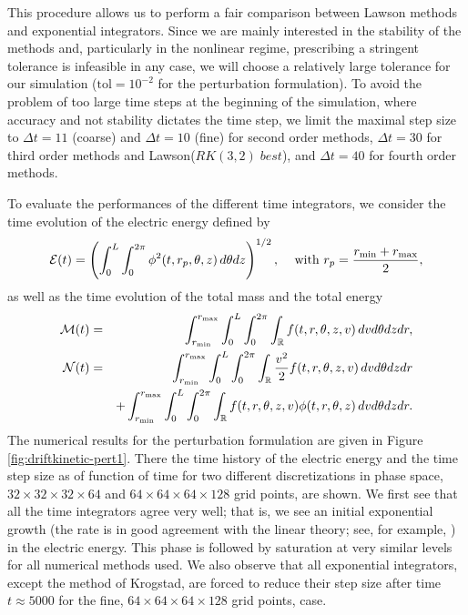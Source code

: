 This procedure allows us to perform a fair comparison between Lawson methods and exponential integrators. Since we are mainly interested in the stability of the methods and, particularly in the nonlinear regime, prescribing a stringent tolerance is infeasible in any case, we will choose a relatively large tolerance for our simulation ($\text{tol}=10^{-2}$ for the perturbation formulation). To avoid the problem of too large time steps at the beginning of the simulation, where accuracy and not stability dictates the time step, we limit the maximal step size to 
$\Delta t=11$ (coarse) and $\Delta t=10$ (fine) for second order methods, $\Delta t=30$ for third order methods and Lawson($RK(3, 2) \; best$), 
and $\Delta t=40$ for fourth order methods.

To evaluate the performances of the different time integrators, we consider the time evolution of the electric energy defined by
$$
{\cal E}(t) = \left( \int_{0}^{L} \int_0^{2\pi} \phi^2(t, r_p, \theta, z ) \,d\theta dz \right)^{1/2}, \;\;\; \mbox{ with } r_p=\frac{r_{\min}+r_{\max}}{2}, 
$$
as well as the time evolution of the total mass and the total energy 
\begin{eqnarray*}
{\cal M}(t) &=& \int_{r_{\min}}^{r_{\max}} \int_{0}^{L} \int_0^{2\pi} \int_{\mathbb R} f(t, r, \theta, z, v ) \,dv d\theta dz dr, \nonumber\\ 
{\cal N}(t) &=&\int_{r_{\min}}^{r_{\max}} \int_{0}^{L} \int_0^{2\pi} \int_{\mathbb R} \frac{v^2}{2} f(t, r, \theta, z, v ) \,dv d\theta dz dr \nonumber\\ 
&& + \int_{r_{\min}}^{r_{\max}} \int_{0}^{L} \int_0^{2\pi} \int_{\mathbb R} f(t, r, \theta, z, v )\phi(t, r, \theta, z) \,dv d\theta dz dr. 
\end{eqnarray*}
The numerical results for the perturbation formulation are given in Figure \ref{fig:driftkinetic-pert1}. There
the time history of the electric energy and the time step size as of function of time for two different 
discretizations in phase space, $32 \times 32 \times 32 \times 64$ and  $64 \times 64 \times 64 \times 128$ grid points, are shown. 
We first see that all the time integrators agree very well; that is, we see an initial exponential growth (the rate is in good agreement with the linear theory; see, for example, \cite{Coulette:2013}) 
in the electric energy. This phase is followed by saturation at very similar levels for all numerical methods used. 
We also observe that all exponential integrators, except the method of Krogstad, are forced to reduce their step size after time $t\approx 5000$ for the fine, \ie $64\times 64 \times 64 \times 128$ grid points, case. 
